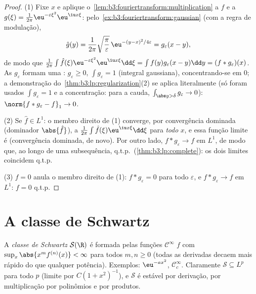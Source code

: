 \begin{proof}
(1) Fixe $x$ e aplique o~\cref{lem:b3:fouriertransform:multiplication} a $f$ e a $g(\xi) = \frac1{2\pi}\eu^{-\varepsilon\xi^2}\eu^{\iu x\xi}$:
pelo~\cref{ex:b3:fouriertransform:gaussian} (com a regra de modulação),
\[
\hat g(y) = \frac1{2\pi}\sqrt{\frac\pi\varepsilon}\,
\eu^{-(y - x)^2/4\varepsilon} = g_\varepsilon(x - y),
\]
de modo que $\frac1{2\pi}\int\hat f(\xi)\eu^{-\varepsilon\xi^2}
\eu^{\iu x\xi}\dd\xi = \int f(y)g_\varepsilon(x - y)\dd y =
(f*g_\varepsilon)(x)$. As $g_\varepsilon$ formam uma : $g_\varepsilon \geq 0$,
$\int g_\varepsilon = 1$ (integral gaussiana), concentrando-se em $0$; a demonstração
do~\cref{thm:b3:lp:regularization}(2) se aplica literalmente (só foram usados $\int g_\varepsilon = 1$ e a
concentração: para a cauda, $\int_{\abs y > \delta}g_\varepsilon \to
0$): $\norm{f * g_\varepsilon - f}_1 \to 0$.

(2) Se $\hat f \in L^1$: o membro direito de (1) converge, por convergência
dominada (dominador $\abs{\hat f}$), a $\frac1{2\pi}\int\hat
f(\xi)\eu^{\iu x\xi}\dd\xi$ para \emph{todo} $x$, e essa função
limite é  (convergência dominada, de novo). Por outro lado,
$f
* g_\varepsilon \to f$ em $L^1$, de modo que, ao longo de uma subsequência, q.t.p.\
(\cref{thm:b3:lp:complete}): os dois limites coincidem q.t.p.

(3) $\hat f = 0$ anula o membro direito de (1): $f *
g_\varepsilon = 0$ para todo $\varepsilon$, e $f *
g_\varepsilon \to f$
em $L^1$: $f = 0$ q.t.p.
\end{proof}

\section{A classe de Schwartz}

\begin{definition}\label{def:b3:fouriertransform:schwartz}
A \emph{classe de Schwartz} $\mathcal
S(\R)$ é formada
pelas funções $\mathcal C^\infty$ $f$ com $\sup_x\abs{x^m f^{(n)}(x)} < \infty$ para todos $m, n \geq 0$ (todas as
derivadas decaem mais rápido do que qualquer potência). Exemplos:
$\eu^{-ax^2}$, $\mathcal C_c^\infty$. Claramente $\mathcal S
\subseteq L^p$ para todo $p$ (limite por $C(1 + x^2)^{-1}$), e
$\mathcal S$ é estável por derivação, por multiplicação por polinômios e por
produtos.
\end{definition}

